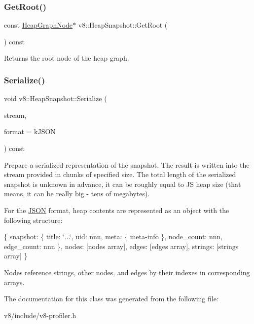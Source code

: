 \subsubsection{\texorpdfstring{Get\+Root()}{GetRoot()}}
{\footnotesize\ttfamily const \mbox{\hyperlink{classv8_1_1HeapGraphNode}{Heap\+Graph\+Node}}$\ast$ v8\+::\+Heap\+Snapshot\+::\+Get\+Root (\begin{DoxyParamCaption}{ }\end{DoxyParamCaption}) const}

Returns the root node of the heap graph. \mbox{\label{classv8_1_1HeapSnapshot_ad2e9773fcdc6785e799400c39d9eeba1}} 
\subsubsection{\texorpdfstring{Serialize()}{Serialize()}}
{\footnotesize\ttfamily void v8\+::\+Heap\+Snapshot\+::\+Serialize (\begin{DoxyParamCaption}\item[{\mbox{\hyperlink{classv8_1_1OutputStream}{Output\+Stream}} $\ast$}]{stream,  }\item[{Serialization\+Format}]{format = {\ttfamily kJSON} }\end{DoxyParamCaption}) const}

Prepare a serialized representation of the snapshot. The result is written into the stream provided in chunks of specified size. The total length of the serialized snapshot is unknown in advance, it can be roughly equal to JS heap size (that means, it can be really big -\/ tens of megabytes).

For the \mbox{\hyperlink{classv8_1_1JSON}{J\+S\+ON}} format, heap contents are represented as an object with the following structure\+:

\{ snapshot\+: \{ title\+: \char`\"{}...\char`\"{}, uid\+: nnn, meta\+: \{ meta-\/info \}, node\+\_\+count\+: nnn, edge\+\_\+count\+: nnn \}, nodes\+: \mbox{[}nodes array\mbox{]}, edges\+: \mbox{[}edges array\mbox{]}, strings\+: \mbox{[}strings array\mbox{]} \}

Nodes reference strings, other nodes, and edges by their indexes in corresponding arrays. 

The documentation for this class was generated from the following file\+:\begin{DoxyCompactItemize}
\item 
v8/include/v8-\/profiler.\+h\end{DoxyCompactItemize}
